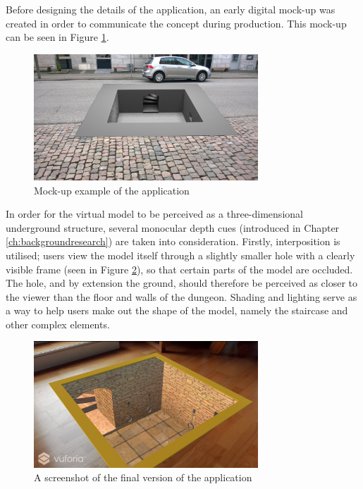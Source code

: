 Before designing the details of the application, an early digital mock-up was created in order to communicate the concept during production. This mock-up can be seen in Figure \ref{fig:mockup}.

\begin{figure}[h!]
   \centering
   \includegraphics[width=0.75\textwidth]{figures/mockup.png}
   \caption{Mock-up example of the application}\label{fig:mockup}
\end{figure}

In order for the virtual model to be perceived as a three-dimensional underground structure, several monocular depth cues (introduced in Chapter \ref{ch:backgroundresearch}) are taken into consideration. Firstly, interposition is utilised; users view the model itself through a slightly smaller hole with a clearly visible frame (seen in Figure \ref{fig:final_screenshot}), so that certain parts of the model are occluded. The hole, and by extension the ground, should therefore be perceived as closer to the viewer than the floor and walls of the dungeon. Shading and lighting serve as a way to help users make out the shape of the model, namely the staircase and other complex elements.

\begin{figure}[h!]
   \centering
   \includegraphics[width=0.75\textwidth]{figures/final_screenshot.png}
   \caption{A screenshot of the final version of the application}\label{fig:final_screenshot}
\end{figure}\pagebreak

